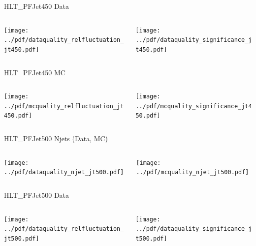\documentclass[9pt]{beamer}
\begin{document}
\begin{frame}[t]{HLT\_PFJet450 Data}
\begin{columns}[T]
  \begin{column}{.5\textwidth}
  \texttt{[image: ../pdf/dataquality\_relfluctuation\_jt450.pdf]}
  \end{column}
  \begin{column}{.5\textwidth}
  \texttt{[image: ../pdf/dataquality\_significance\_jt450.pdf]}
  \end{column}
\end{columns}
\end{frame}

\begin{frame}[t]{HLT\_PFJet450 MC}
\begin{columns}[T]
  \begin{column}{.5\textwidth}
  \texttt{[image: ../pdf/mcquality\_relfluctuation\_jt450.pdf]}
  \end{column}
  \begin{column}{.5\textwidth}
  \texttt{[image: ../pdf/mcquality\_significance\_jt450.pdf]}
  \end{column}
\end{columns}
\end{frame}

\begin{frame}[t]{HLT\_PFJet500 Njets (Data, MC)}
\begin{columns}[T]
  \begin{column}{.5\textwidth}
  \texttt{[image: ../pdf/dataquality\_njet\_jt500.pdf]}
  \end{column}
  \begin{column}{.5\textwidth}
  \texttt{[image: ../pdf/mcquality\_njet\_jt500.pdf]}
  \end{column}
\end{columns}
\end{frame}

\begin{frame}[t]{HLT\_PFJet500 Data}
\begin{columns}[T]
  \begin{column}{.5\textwidth}
  \texttt{[image: ../pdf/dataquality\_relfluctuation\_jt500.pdf]}
  \end{column}
  \begin{column}{.5\textwidth}
  \texttt{[image: ../pdf/dataquality\_significance\_jt500.pdf]}
  \end{column}
\end{columns}
\end{frame}
\end{document}
